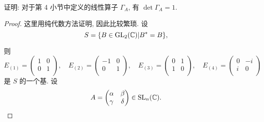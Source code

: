 \documentclass{ctexart}
\begin{document}
\begin{exercise}%
    证明: 对于第 4 小节中定义的线性算子 $\Gamma_A$, 有 $\det\Gamma_A=1$.
\end{exercise}
\begin{proof}
    这里用纯代数方法证明, 因此比较繁琐. 设
    \[S=\{B\in\operatorname{GL} _2(\mathbb{C})|B^*=B\},\]
    
    则
    \[E_{(1)}=\begin{pmatrix}
        1 & 0 \\
        0 & 1 \\
    \end{pmatrix},\quad E_{(2)}=\begin{pmatrix}
        -1 & 0 \\
        0 & 1 \\
    \end{pmatrix},\quad E_{(3)}=\begin{pmatrix}
        0 & 1 \\
        1 & 0 \\
    \end{pmatrix},\quad E_{(4)}=\begin{pmatrix}
        0 & -i \\
        i & 0 \\
    \end{pmatrix}\]
    是 $S$ 的一个基. 设
    \[A=\begin{pmatrix}
        \alpha & \beta \\
        \gamma & \delta \\
    \end{pmatrix}\in\operatorname{SL} _n(\mathbb{C}).\]


\end{proof}
\end{document}
